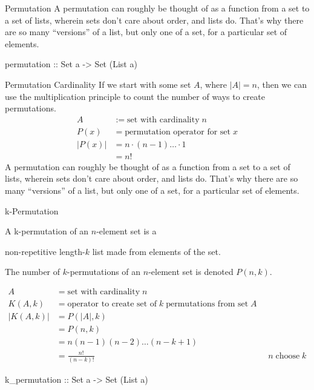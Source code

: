 \documentclass[openany, 12pt]{book}
\begin{document}
\begin{intuition}{Permutation}{}
	A permutation can roughly be thought of as a function from a set to a set of
	lists, wherein sets don't care about order, and lists do.  That's why there
	are so many ``versions'' of a list, but only one of a set, for a particular
	set of elements.
	\begin{haskell}{}
		permutation :: Set a -> Set (List a)
	\end{haskell}
\end{intuition}

\begin{intuition}{Permutation Cardinality}{}
	If we start with some set $A$, where $|A|=n$, then we can use the multiplication
	principle to count the number of ways to create permutations.
	\begin{align*}
		A      & := \text{set with cardinality}\;n        \\
		P(x)   & = \text{permutation operator for set}\;x \\
		|P(x)| & = n\cdot(n-1)\ldots\cdot 1               \\
		       & = n!
	\end{align*}
	A permutation can roughly be thought of as a function from a set to a set of
	lists, wherein sets don't care about order, and lists do.  That's why there
	are so many ``versions'' of a list, but only one of a set, for a particular
	set of elements.
\end{intuition}

\begin{definition}{k-Permutation}{}
	\begin{blist}
		\item A k-permutation of an $n$-element set is a
		\item non-repetitive length-$k$ list made from elements of the set.
		\item The number of $k$-permutations of an $n$-element set is denoted
		$P(n, k)$.
	\end{blist}
	\begin{align*}
		A         & =\text{set with cardinality}\;n                                                                \\
		K(A, k)   & =\text{operator to create set of}\;k\;\text{permutations from set}\;A                          \\
		|K(A, k)| & = P(|A|, k)                                                                                    \\
		          & = P(n, k)                                                                                      \\
		          & =n(n-1)(n-2) \ldots(n-k+1)                                                                     \\
		          & =\frac{n!}{(n-k)!}                                                    &  & n\;\text{choose}\;k
	\end{align*}
	\begin{haskell}{}
		k_permutation :: Set a -> Set (List a)
	\end{haskell}
\end{definition}
\end{document}
